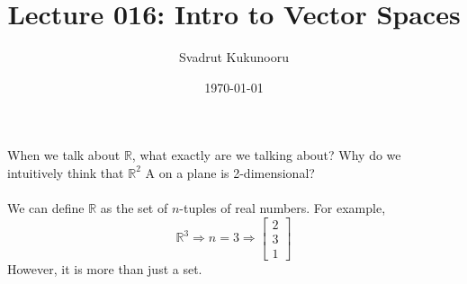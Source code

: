 \documentclass[letterpaper]{report}
\title{Lecture 016: Intro to Vector Spaces}
\author{Svadrut Kukunooru}
\date{\today}
\begin{document}
\begin{titlepage}
    \maketitle
\end{titlepage}
When we talk about $\mathbb{R}$, what exactly are we talking about? Why do we intuitively think that $\mathbb{R}^2$ A on a plane is 2-dimensional? \\ \\
We can define $\mathbb{R}$ as the set of $n$-tuples of real numbers. For example, 
\[
    \mathbb{R}^3 \Rightarrow n = 3 \Rightarrow
    \begin{bmatrix} 
    2 \\ 3 \\ 1
    \end{bmatrix} 
\] 
However, it is more than just a set. 
\end{document}
